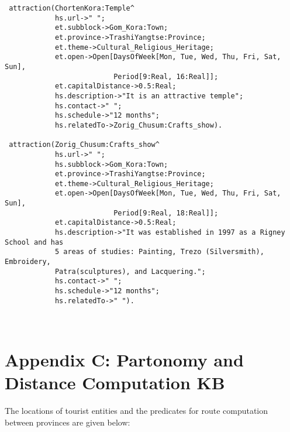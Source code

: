 \begin{verbatim}
 attraction(ChortenKora:Temple^
            hs.url->" ";
            et.subblock->Gom_Kora:Town;
            et.province->TrashiYangtse:Province;
            et.theme->Cultural_Religious_Heritage;
            et.open->Open[DaysOfWeek[Mon, Tue, Wed, Thu, Fri, Sat, Sun],
                          Period[9:Real, 16:Real]];
            et.capitalDistance->0.5:Real;
            hs.description->"It is an attractive temple";
            hs.contact->" ";
            hs.schedule->"12 months";
            hs.relatedTo->Zorig_Chusum:Crafts_show).

 attraction(Zorig_Chusum:Crafts_show^
            hs.url->" ";
            hs.subblock->Gom_Kora:Town;
            et.province->TrashiYangtse:Province;
            et.theme->Cultural_Religious_Heritage;
            et.open->Open[DaysOfWeek[Mon, Tue, Wed, Thu, Fri, Sat, Sun],
                          Period[9:Real, 18:Real]];
            et.capitalDistance->0.5:Real;
            hs.description->"It was established in 1997 as a Rigney School and has 
            5 areas of studies: Painting, Trezo (Silversmith), Embroidery, 
            Patra(sculptures), and Lacquering.";
            hs.contact->" ";
            hs.schedule->"12 months";
            hs.relatedTo->" ").                                 

 	
\end{verbatim}

\chapter*{Appendix C: Partonomy and Distance Computation KB}
The locations of tourist entities and the predicates for route computation between 
provinces are given below: 
